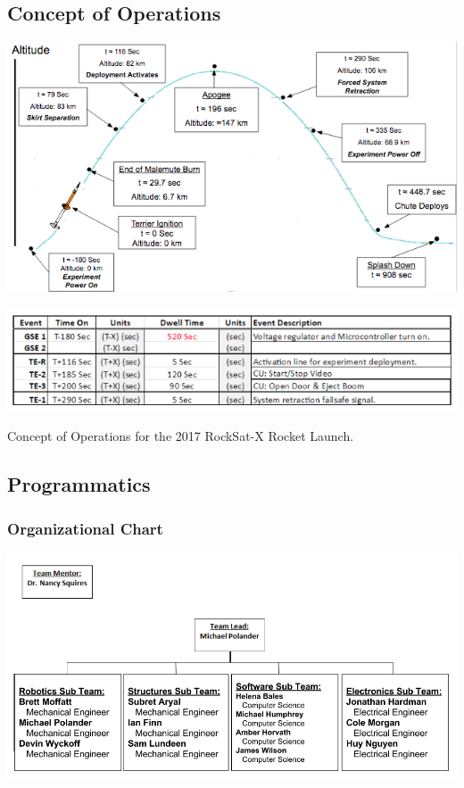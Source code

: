 \documentclass[letterpaper,10pt]{article}
\begin{document}
\subsection{Concept of Operations}
\includegraphics[width=\textwidth]{./images/conops}

\includegraphics[width=\textwidth]{./images/conopsTable}
\begin{center}
	Concept of Operations for the 2017 RockSat-X Rocket Launch.
\end{center}

\subsection{Programmatics}
\subsubsection{Organizational Chart}
\includegraphics[width=\textwidth]{./images/orgChart.png}
\end{document}
